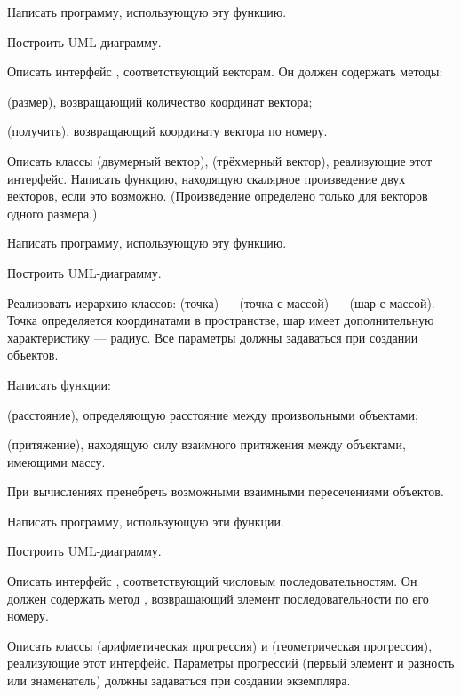 Написать программу, использующую эту функцию.

Построить UML-диаграмму.

\task Описать интерфейс , соответствующий векторам. Он
должен содержать методы:
\begin{itemize*}
\item {} (размер), возвращающий количество координат вектора;
\item {} (получить), возвращающий координату вектора по номеру.
\end{itemize*}

Описать классы  (двумерный вектор), 
(трёхмерный вектор), реализующие этот интерфейс. Написать функцию,
находящую скалярное произведение двух векторов, если это возможно.
(Произведение определено только для векторов одного размера.)

Написать программу, использующую эту функцию.

Построить UML-диаграмму.

\task Реализовать иерархию классов:  (точка) —
 (точка с массой) —  (шар с
массой). Точка определяется координатами в пространстве, шар имеет
дополнительную характеристику — радиус. Все параметры должны
задаваться при создании объектов.

Написать функции:
\begin{itemize*}
\item {} (расстояние), определяющую расстояние между
  произвольными объектами;
\item {} (притяжение), находящую силу взаимного
  притяжения между объектами, имеющими массу.
\end{itemize*}
При вычислениях пренебречь возможными взаимными пересечениями
объектов.

Написать программу, использующую эти функции.

Построить UML-диаграмму.

\task Описать интерфейс , соответствующий числовым
последовательностям. Он должен содержать метод ,
возвращающий элемент последовательности по его номеру.

Описать классы  (арифметическая прогрессия)
и  (геометрическая прогрессия), реализующие
этот интерфейс. Параметры прогрессий (первый элемент и разность или
знаменатель) должны задаваться при создании экземпляра.

